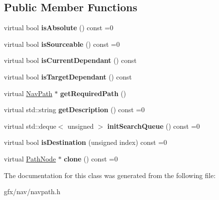 \subsection*{Public Member Functions}
\begin{DoxyCompactItemize}
\item 
virtual bool {\bfseries is\+Absolute} () const =0\hypertarget{classPathNode_a356e7b7605df695b28616d08c61259cc}{}\label{classPathNode_a356e7b7605df695b28616d08c61259cc}

\item 
virtual bool {\bfseries is\+Sourceable} () const =0\hypertarget{classPathNode_a8b5dc54c01b8e8769a7102b06de64786}{}\label{classPathNode_a8b5dc54c01b8e8769a7102b06de64786}

\item 
virtual bool {\bfseries is\+Current\+Dependant} () const \hypertarget{classPathNode_a0847217e3fa9258d42009376188d1582}{}\label{classPathNode_a0847217e3fa9258d42009376188d1582}

\item 
virtual bool {\bfseries is\+Target\+Dependant} () const \hypertarget{classPathNode_a64169e8441ce0be9f22065a8f6a2a00f}{}\label{classPathNode_a64169e8441ce0be9f22065a8f6a2a00f}

\item 
virtual \hyperlink{classNavPath}{Nav\+Path} $\ast$ {\bfseries get\+Required\+Path} ()\hypertarget{classPathNode_aff8495cb855d408b1cc6b3c3b55b2717}{}\label{classPathNode_aff8495cb855d408b1cc6b3c3b55b2717}

\item 
virtual std\+::string {\bfseries get\+Description} () const =0\hypertarget{classPathNode_a870dd2e6e9af9788a02942f938be8481}{}\label{classPathNode_a870dd2e6e9af9788a02942f938be8481}

\item 
virtual std\+::deque$<$ unsigned $>$ {\bfseries init\+Search\+Queue} () const =0\hypertarget{classPathNode_aeedf2f3c81ee260855723db0a6b8a8b7}{}\label{classPathNode_aeedf2f3c81ee260855723db0a6b8a8b7}

\item 
virtual bool {\bfseries is\+Destination} (unsigned index) const =0\hypertarget{classPathNode_afaceb9abe954312fa40a398d74edfbe5}{}\label{classPathNode_afaceb9abe954312fa40a398d74edfbe5}

\item 
virtual \hyperlink{classPathNode}{Path\+Node} $\ast$ {\bfseries clone} () const =0\hypertarget{classPathNode_ac292dd6e2721e588acd9afe883da6440}{}\label{classPathNode_ac292dd6e2721e588acd9afe883da6440}

\end{DoxyCompactItemize}


The documentation for this class was generated from the following file\+:\begin{DoxyCompactItemize}
\item 
gfx/nav/navpath.\+h\end{DoxyCompactItemize}
